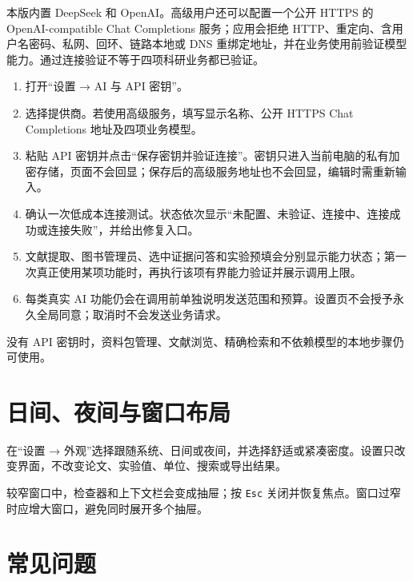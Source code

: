 \documentclass[11pt,a4paper]{ctexart}
\begin{document}
本版内置 DeepSeek 和 OpenAI。高级用户还可以配置一个公开 HTTPS 的 OpenAI-compatible Chat Completions 服务；应用会拒绝 HTTP、重定向、含用户名密码、私网、回环、链路本地或 DNS 重绑定地址，并在业务使用前验证模型能力。通过连接验证不等于四项科研业务都已验证。

\begin{enumerate}
  \item 打开“设置 → AI 与 API 密钥”。
  \item 选择提供商。若使用高级服务，填写显示名称、公开 HTTPS Chat Completions 地址及四项业务模型。
  \item 粘贴 API 密钥并点击“保存密钥并验证连接”。密钥只进入当前电脑的私有加密存储，页面不会回显；保存后的高级服务地址也不会回显，编辑时需重新输入。
  \item 确认一次低成本连接测试。状态依次显示“未配置、未验证、连接中、连接成功或连接失败”，并给出修复入口。
  \item 文献提取、图书管理员、选中证据问答和实验预填会分别显示能力状态；第一次真正使用某项功能时，再执行该项有界能力验证并展示调用上限。
  \item 每类真实 AI 功能仍会在调用前单独说明发送范围和预算。设置页不会授予永久全局同意；取消时不会发送业务请求。
\end{enumerate}

没有 API 密钥时，资料包管理、文献浏览、精确检索和不依赖模型的本地步骤仍可使用。

\section{日间、夜间与窗口布局}

在“设置 → 外观”选择跟随系统、日间或夜间，并选择舒适或紧凑密度。设置只改变界面，不改变论文、实验值、单位、搜索或导出结果。

较窄窗口中，检查器和上下文栏会变成抽屉；按 \texttt{Esc} 关闭并恢复焦点。窗口过窄时应增大窗口，避免同时展开多个抽屉。

\section{常见问题}
\end{document}
